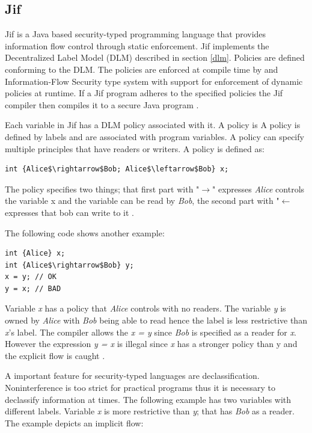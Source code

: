 \subsection{Jif}

Jif is a Java based security-typed programming language that provides information flow control through static enforcement. Jif implements the Decentralized Label Model (DLM) described in section \ref{dlm}. Policies are defined conforming to the DLM. The policies are enforced at compile time by and Information-Flow Security type system with support for enforcement of dynamic policies at runtime. If a Jif program adheres to the specified policies the Jif compiler then compiles it to a secure Java program \cite{jifmanual}. 

Each variable in Jif has a DLM
policy associated with it. A policy
is
A policy is defined by labels and are associated with program variables. A policy can specify multiple principles that have readers or writers. A policy is defined as: 

\begin{lstlisting}[mathescape]
int {Alice$\rightarrow$Bob; Alice$\leftarrow$Bob} x;
\end{lstlisting}

The policy specifies two things; that first part with "$\rightarrow$" expresses \emph{Alice} controls the variable x and the variable can be read by \emph{Bob}, the second part with "$\leftarrow$ expresses that bob can write to it \cite{jifmanual}. 

The following code shows another example:

\begin{lstlisting}[mathescape]
int {Alice} x;
int {Alice$\rightarrow$Bob} y;
x = y; // OK
y = x; // BAD
\end{lstlisting}


Variable  \emph{x} has a policy that \emph{Alice} controls with no readers. The variable \emph{y} is owned by \emph{Alice} with \emph{Bob} being able to read hence the label is less restrictive than \emph{x}'s label. The compiler allows the \emph{x = y} since \emph{Bob} is specified as a reader for \emph{x}. However the expression \emph{y = x} is illegal since \emph{x} has a stronger policy than y and the explicit flow is caught \cite{jifmanual}.


A important feature for security-typed languages are declassification. Noninterference is too strict for practical programs thus it is necessary to declassify information at times. The following example has two variables with different labels. Variable \emph{x} is more restrictive than \emph{y}; that has \emph{Bob} as a reader. The example depicts an implicit flow: 

